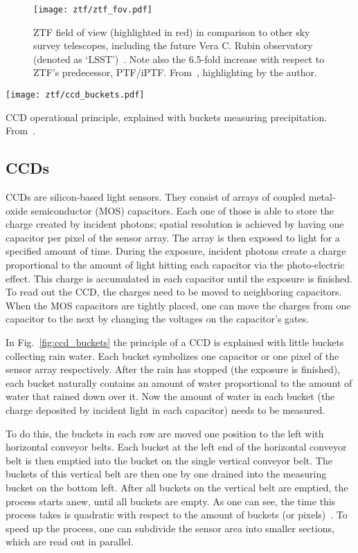 \begin{figure}[htb]
    \texttt{[image: ztf/ztf\_fov.pdf]}
    \caption[ZTF field of view]{ZTF field of view (highlighted in red) in comparison to other sky survey telescopes, including the future Vera C. Rubin observatory (denoted as `LSST')~\cite{Ivezic2019}. Note also the 6.5-fold increase with respect to ZTF's predecessor, PTF/iPTF. From~\cite{Laher2018}, highlighting by the author.}
\end{figure}

\begin{marginfigure}
    \texttt{[image: ztf/ccd\_buckets.pdf]}
    \caption[CCD operational principle]{CCD operational principle, explained with buckets measuring precipitation. From~\cite{Janesick1987}.}
\end{marginfigure}

\subsection{CCDs}\label{ccd}
CCDs are silicon-based light sensors. They consist of arrays of coupled metal-oxide semiconductor (MOS) capacitors. Each one of those is able to store the charge created by incident photons; spatial resolution is achieved by having one capacitor per pixel of the sensor array. The array is then exposed to light for a specified amount of time. During the exposure, incident photons create a charge proportional to the amount of light hitting each capacitor via the photo-electric effect. This charge is accumulated in each capacitor until the exposure is finished. To read out the CCD, the charges need to be moved to neighboring capacitors. When the MOS capacitors are tightly placed, one can move the charges from one capacitor to the next by changing the voltages on the capacitor's gates.

In Fig.~\ref{fig:ccd_buckets} the principle of a CCD is explained with little buckets collecting rain water. Each bucket symbolizes one capacitor or one pixel of the sensor array respectively. After the rain has stopped (the exposure is finished), each bucket naturally contains an amount of water proportional to the amount of water that rained down over it. Now the amount of water in each bucket (the charge deposited by incident light in each capacitor) needs to be measured.

To do this, the buckets in each row are moved one position to the left with horizontal conveyor belts. Each bucket at the left end of the horizontal conveyor belt is then emptied into the bucket on the single vertical conveyor belt. The buckets of this vertical belt are then one by one drained into the measuring bucket on the bottom left. After all buckets on the vertical belt are emptied, the process starts anew, until all buckets are empty. As one can see, the time this process takes is quadratic with respect to the amount of buckets (or pixels)~. To speed up the process, one can subdivide the sensor area into smaller sections, which are read out in parallel.

